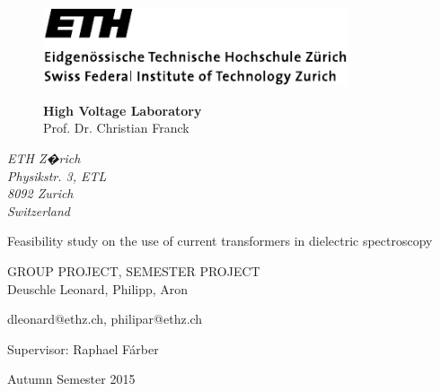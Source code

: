 


\pagestyle{empty}

\begin{figure}
    \begin{minipage}[b]{0.5\linewidth}
        \includegraphics[width=0.8\textwidth]{figures/ethlogo}
    \end{minipage}
    \hfill
    \begin{minipage}[b]{0.45\linewidth}
        \flushright
        \textbf{High Voltage Laboratory}\\
        \vspace{3mm}
        Prof. Dr. Christian Franck
    \end{minipage}
\end{figure}


\begin{flushright}
    \textit{ETH Z�rich\\
    Physikstr. 3, ETL\\
    8092 Zurich\\
    Switzerland}
\end{flushright}

\phantom{u}
\vspace{1.5cm}
\Huge{\sc Feasibility study on the use of current transformers in dielectric spectroscopy}
\vspace{1.5cm}

\Large
GROUP PROJECT, SEMESTER PROJECT\\

\vspace*{5cm} \large
Deuschle Leonard, Philipp, Aron

dleonard@ethz.ch, philipar@ethz.ch

\normalsize

\vspace{1.5cm}

Supervisor: Raphael F\'arber

Autumn Semester 2015